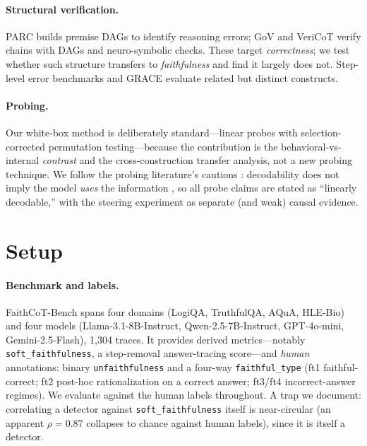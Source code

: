 \documentclass[11pt]{article}
\begin{document}
\paragraph{Structural verification.} PARC \citep{mukherjee2025parc} builds premise DAGs to identify reasoning errors; GoV \citep{fang2025gov} and VeriCoT \citep{feng2025vericot} verify chains with DAGs and neuro-symbolic checks. These target \emph{correctness}; we test whether such structure transfers to \emph{faithfulness} and find it largely does not. Step-level error benchmarks \citep{zheng2024processbench,jacovi2024reveal} and GRACE \citep{pham2026grace} evaluate related but distinct constructs.

\paragraph{Probing.} Our white-box method is deliberately standard---linear probes with selection-corrected permutation testing---because the contribution is the behavioral-vs-internal \emph{contrast} and the cross-construction transfer analysis, not a new probing technique. We follow the probing literature's cautions \citep{belinkov2022probing}: decodability does not imply the model \emph{uses} the information \citep{elazar2021amnesic}, so all probe claims are stated as ``linearly decodable,'' with the steering experiment as separate (and weak) causal evidence.

\section{Setup}
\label{sec:setup}

\paragraph{Benchmark and labels.} FaithCoT-Bench spans four domains (LogiQA, TruthfulQA, AQuA, HLE-Bio) and four models (Llama-3.1-8B-Instruct, Qwen-2.5-7B-Instruct, GPT-4o-mini, Gemini-2.5-Flash), 1{,}304 traces. It provides derived metrics---notably \texttt{soft\_faithfulness}, a step-removal answer-tracing score---and \emph{human} annotations: binary \texttt{unfaithfulness} and a four-way \texttt{faithful\_type} (ft1 faithful-correct; ft2 post-hoc rationalization on a correct answer; ft3/ft4 incorrect-answer regimes). We evaluate against the human labels throughout. A trap we document: correlating a detector against \texttt{soft\_faithfulness} itself is near-circular (an apparent $\rho{=}0.87$ collapses to chance against human labels), since it is itself a detector.
\end{document}
